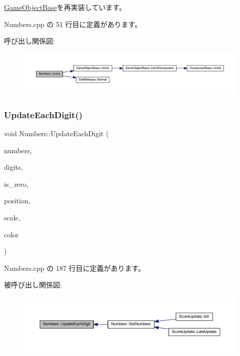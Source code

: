 \mbox{\hyperlink{class_game_object_base_a97e1bc277d7b1c0156d4735de29a022c}{Game\+Object\+Base}}を再実装しています。



 Numbers.\+cpp の 51 行目に定義があります。

呼び出し関係図\+:\nopagebreak
\begin{figure}[H]
\begin{center}
\leavevmode
\includegraphics[width=350pt]{class_numbers_aeaad3cc1b8ae7defe79813b983b04101_cgraph}
\end{center}
\end{figure}
\mbox{\label{class_numbers_a629383f243c0aeb25bf9e8d067e965a2}} 
\subsubsection{\texorpdfstring{Update\+Each\+Digit()}{UpdateEachDigit()}}
{\footnotesize\ttfamily void Numbers\+::\+Update\+Each\+Digit (\begin{DoxyParamCaption}\item[{int}]{numbers,  }\item[{int}]{digits,  }\item[{bool}]{is\+\_\+zero,  }\item[{\mbox{\hyperlink{_vector3_d_8h_a5ef6e95dfc5f9d3820b71772d99bbc25}{Vec2}}}]{position,  }\item[{\mbox{\hyperlink{_vector3_d_8h_a5ef6e95dfc5f9d3820b71772d99bbc25}{Vec2}}}]{scale,  }\item[{\mbox{\hyperlink{_vector3_d_8h_a680c30c4a07d86fe763c7e01169cd6cc}{X\+Color4}}}]{color }\end{DoxyParamCaption})\hspace{0.3cm}{\ttfamily [private]}}



 Numbers.\+cpp の 187 行目に定義があります。

被呼び出し関係図\+:\nopagebreak
\begin{figure}[H]
\begin{center}
\leavevmode
\includegraphics[width=350pt]{class_numbers_a629383f243c0aeb25bf9e8d067e965a2_icgraph}
\end{center}
\end{figure}


